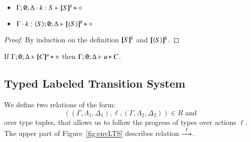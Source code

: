 \begin{proposition}\rm
$ $
	\begin{itemize}
		\item	$\Gamma; \emptyset; \Delta \cdot k:S \vdash [\!\![S]\!\!]^k \triangleright \diamond$
		\item	$\Gamma \cdot k:\langle S \rangle; \emptyset; \Delta \vdash [\!\![\langle S \rangle]\!\!]^k \triangleright \diamond$
	\end{itemize}
\end{proposition}

\begin{proof}
	By induction on the definition $[\!\![S]\!\!]^k$ and $[\!\![\langle S \rangle]\!\!]^k$.
\end{proof}

\begin{corollary}\rm
	If $\Gamma; \emptyset; \Delta \vdash [\!\![C]\!\!]^{u} \triangleright \diamond$
	then
	$\Gamma; \emptyset; \Delta \vdash u \triangleright C$.
\end{corollary}


\subsection{Typed Labeled Transition System}



We define two relations of the form:
%
\[
	((\Gamma, \Lambda_1, \Delta_1), \ell, (\Gamma, \Lambda_2, \Delta_2)) \in R \textrm{ and }
\]
%
\noi over type tuples, that allows us to follow the progress of types over actions $\ell$.
The upper part of Figure~\ref{fig:envLTS} describes relation $\stackrel{\ell}{\longrightarrow}$.

